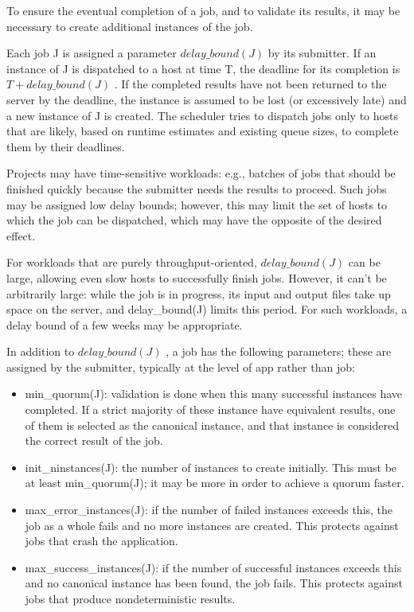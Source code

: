 \documentclass[
]{article}
\providecommand{\tightlist}{%
  \setlength{\itemsep}{0pt}\setlength{\parskip}{0pt}}
\begin{document}
To ensure the eventual completion of a job, and to validate its results,
it may be necessary to create additional instances of the job.

Each job J is assigned a parameter \(delay\_bound(J)\) by its submitter.
If an instance of J is dispatched to a host at time T, the deadline for
its completion is \(T + delay\_bound(J)\) . If the completed results
have not been returned to the server by the deadline, the instance is
assumed to be lost (or excessively late) and a new instance of J is
created. The scheduler tries to dispatch jobs only to hosts that are
likely, based on runtime estimates and existing queue sizes, to complete
them by their deadlines.

Projects may have time-sensitive workloads: e.g., batches of jobs that
should be finished quickly because the submitter needs the results to
proceed. Such jobs may be assigned low delay bounds; however, this may
limit the set of hosts to which the job can be dispatched, which may
have the opposite of the desired effect.

For workloads that are purely throughput-oriented, \(delay\_bound(J)\)
can be large, allowing even slow hosts to successfully finish jobs.
However, it can't be arbitrarily large: while the job is in progress,
its input and output files take up space on the server, and
delay\_bound(J) limits this period. For such workloads, a delay bound of
a few weeks may be appropriate.

In addition to \(delay\_bound(J)\) , a job has the following parameters;
these are assigned by the submitter, typically at the level of app
rather than job:

\begin{itemize}
\tightlist
\item
  min\_quorum(J): validation is done when this many successful instances
  have completed. If a strict majority of these instance have equivalent
  results, one of them is selected as the canonical instance, and that
  instance is considered the correct result of the job.\\
\item
  init\_ninstances(J): the number of instances to create initially. This
  must be at least min\_quorum(J); it may be more in order to achieve a
  quorum faster.\\
\item
  max\_error\_instances(J): if the number of failed instances exceeds
  this, the job as a whole fails and no more instances are created. This
  protects against jobs that crash the application.\\
\item
  max\_success\_instances(J): if the number of successful instances
  exceeds this and no canonical instance has been found, the job fails.
  This protects against jobs that produce nondeterministic results.
\end{itemize}
\end{document}
